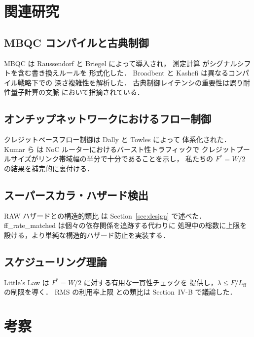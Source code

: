 \documentclass[journal,10pt,twocolumn]{IEEEtran}
\begin{document}
\section{関連研究}

\subsection{MBQC コンパイルと古典制御}

MBQC は Raussendorf と Briegel \cite{RaussendorfBriegel2001} によって導入され，
測定計算 \cite{DanosKashefi2006} がシグナルシフトを含む書き換えルールを
形式化した．
Broadbent と Kashefi \cite{Broadbent2009} は異なるコンパイル戦略下での
深さ複雑性を解析した．
古典制御レイテンシの重要性は誤り耐性量子計算の文脈
\cite{FowlerMartinis2012,RaussendorfHarrington2007} において指摘されている．

\subsection{オンチップネットワークにおけるフロー制御}

クレジットベースフロー制御は Dally と Towles \cite{DallyTowles2004} によって
体系化された．
Kumar ら \cite{KumarPeh2007} は NoC ルーターにおけるバースト性トラフィックで
クレジットプールサイズがリンク帯域幅の半分で十分であることを示し，
私たちの $F^* = W/2$ の結果を補完的に裏付ける．

\subsection{スーパースカラ・ハザード検出}

RAW ハザードとの構造的類比 \cite{Tomasulo1967,HennessyPatterson2017} は
Section~\ref{sec:design} で述べた．
ff\_rate\_matched は個々の依存関係を追跡する代わりに
処理中の総数に上限を設ける，より単純な構造的ハザード防止を実装する．

\subsection{スケジューリング理論}

Little's Law \cite{Little1961} は $F^* = W/2$ に対する有用な一貫性チェックを
提供し，$\lambda \leq F / L_{\mathrm{ff}}$ の制限を導く．
RMS の利用率上限 \cite{LiuLayland1973} との類比は Section~IV-B で議論した．

\section{考察}
\end{document}
